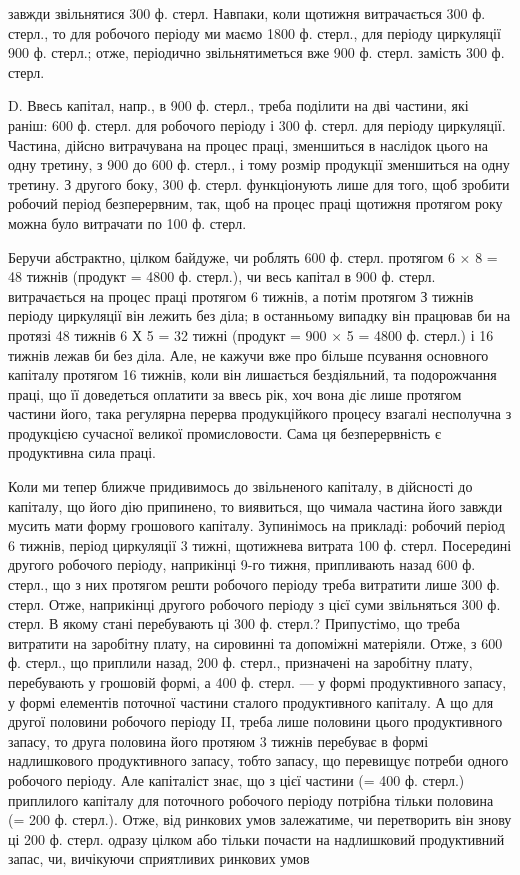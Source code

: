\parcont{}  %
завжди звільнятися 300 ф. стерл. Навпаки, коли щотижня витрачається
300 ф. стерл., то для робочого періоду ми маємо 1800 ф. стерл., для періоду
циркуляції 900 ф. стерл.; отже, періодично звільнятиметься вже 900 ф. стерл.
замість 300 ф. стерл.

D. Ввесь капітал, напр., в 900 ф. стерл., треба поділити на дві частини,
які раніш: 600 ф. стерл. для робочого періоду і 300 ф. стерл. для періоду
циркуляції. Частина, дійсно витрачувана на процес праці, зменшиться в
наслідок цього на одну третину, з 900 до 600 ф. стерл., і тому розмір продукції
зменшиться на одну третину. З другого боку, 300 ф. стерл.
функціонують лише для того, щоб зробити робочий період безперервним,
так, щоб на процес праці щотижня протягом року можна було витрачати
по 100 ф. стерл.

Беручи абстрактно, цілком байдуже, чи роблять 600 ф. стерл. протягом
6 × 8 = 48 тижнів (продукт = 4800 ф. стерл.), чи весь капітал в 900 ф. стерл.
витрачається на процес праці протягом 6 тижнів, а потім протягом
З тижнів періоду циркуляції він лежить без діла; в останньому випадку
він працював би на протязі 48 тижнів 6 Х 5  = 32 тижні (продукт =
900 × 5 = 4800 ф. стерл.) і 16 тижнів лежав би без діла. Але, не кажучи
вже про більше псування основного капіталу протягом 16 тижнів, коли
він лишається бездіяльний, та подорожчання праці, що її доведеться оплатити
за ввесь рік, хоч вона діє лише протягом частини його, така регулярна
перерва продукційкого процесу взагалі несполучна з продукцією
сучасної великої промисловости. Сама ця безперервність є продуктивна
сила праці.

Коли ми тепер ближче придивимось до звільненого капіталу, в дійсності
до капіталу, що його дію припинено, то виявиться, що чимала
частина його завжди мусить мати форму грошового капіталу. Зупинімось
на прикладі: робочий період 6 тижнів, період циркуляції 3 тижні, щотижнева
витрата 100 ф. стерл. Посередині другого робочого періоду,
наприкінці 9-го тижня, припливають назад 600 ф. стерл., що з них протягом
решти робочого періоду треба витратити лише 300 ф. стерл.
Отже, наприкінці другого робочого періоду з цієї суми звільняться
300 ф. стерл. В якому стані перебувають ці 300 ф. стерл.? Припустімо,
що  треба витратити на заробітну плату,  на сировинні та допоміжні
матеріяли. Отже, з 600 ф. стерл., що приплили назад, 200 ф. стерл., призначені
на заробітну плату, перебувають у грошовій формі, а 400 ф.
стерл. — у формі продуктивного запасу, у формі елементів поточної
частини сталого продуктивного капіталу. А що для другої половини
робочого періоду II, треба лише половини цього продуктивного запасу,
то друга половина його протяюм 3 тижнів перебуває в формі надлишкового
продуктивного запасу, тобто запасу, що перевищує потреби одного
робочого періоду. Але капіталіст знає, що з цієї частини (= 400 ф. стерл.)
приплилого капіталу для поточного робочого періоду потрібна тільки
половина (= 200 ф. стерл.). Отже, від ринкових умов залежатиме, чи
перетворить він знову ці 200 ф. стерл. одразу цілком або тільки почасти на
надлишковий продуктивний запас, чи, вичікуючи сприятливих ринкових умов
\parbreak{}  %

